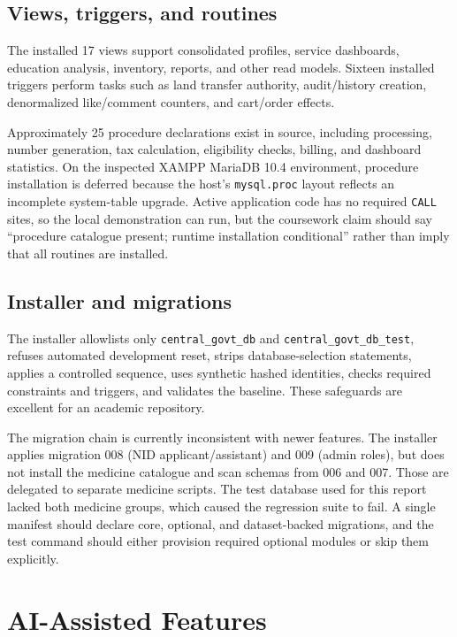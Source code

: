\documentclass[12pt,a4paper,oneside]{report}
\newcommand{\code}[1]{\texttt{#1}}
\begin{document}
\section{Views, triggers, and routines}

The installed 17 views support consolidated profiles, service dashboards, education analysis,
inventory, reports, and other read models. Sixteen installed triggers perform tasks such as land
transfer authority, audit/history creation, denormalized like/comment counters, and cart/order
effects.

Approximately 25 procedure declarations exist in source, including processing, number generation,
tax calculation, eligibility checks, billing, and dashboard statistics. On the inspected XAMPP
MariaDB 10.4 environment, procedure installation is deferred because the host's
\code{mysql.proc} layout reflects an incomplete system-table upgrade. Active application code has
no required \code{CALL} sites, so the local demonstration can run, but the coursework claim should
say ``procedure catalogue present; runtime installation conditional'' rather than imply that all
routines are installed.

\section{Installer and migrations}

The installer allowlists only \code{central\_govt\_db} and \code{central\_govt\_db\_test}, refuses
automated development reset, strips database-selection statements, applies a controlled sequence,
uses synthetic hashed identities, checks required constraints and triggers, and validates the
baseline. These safeguards are excellent for an academic repository.

The migration chain is currently inconsistent with newer features. The installer applies
migration 008 (NID applicant/assistant) and 009 (admin roles), but does not install the medicine
catalogue and scan schemas from 006 and 007. Those are delegated to separate medicine scripts.
The test database used for this report lacked both medicine groups, which caused the regression
suite to fail. A single manifest should declare core, optional, and dataset-backed migrations,
and the test command should either provision required optional modules or skip them explicitly.

\chapter{AI-Assisted Features}
\end{document}
